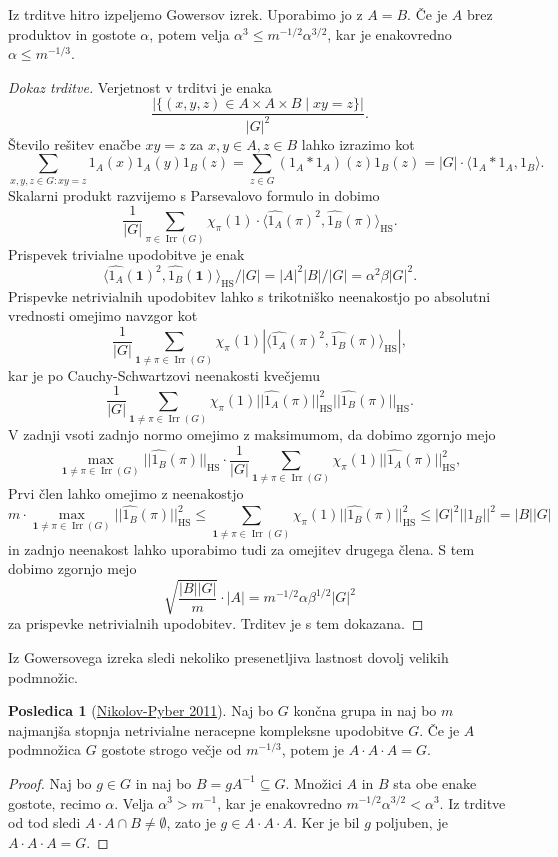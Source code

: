 \documentclass[11pt]{book}
\def\11{\mathbf{1}}
\DeclareMathOperator\Irr{Irr}
\DeclareMathOperator\HS{HS}
\theoremstyle{definition}
\theoremstyle{zgled}
\theoremstyle{odprtproblem}
\theoremstyle{domacanaloga}
\newenvironment{dokaz}
    {\color{siva}\begin{proof}}
    {\end{proof}}
\theoremstyle{izrek}
\newtheorem*{posledica}{Posledica}
\begin{document}
Iz trditve hitro izpeljemo Gowersov izrek. Uporabimo jo z $A=B$. Če je $A$ brez produktov in gostote $\alpha$, potem velja $\alpha^3 \leq m^{-1/2} \alpha^{3/2}$, kar je enakovredno $\alpha \leq m^{-1/3}$.


\begin{dokaz}[Dokaz trditve]
Verjetnost v trditvi je enaka 
\[
    \frac{|\{ (x,y,z) \in A \times A \times B \mid xy = z \}|}{|G|^2}.
\]
Število rešitev enačbe $xy = z$ za $x,y \in A, z \in B$ lahko izrazimo kot
\[
    \sum_{x,y,z \in G \colon xy = z} 1_A(x) 1_A(y) 1_B(z)
    = \sum_{z \in G} (1_A * 1_A)(z) 1_B(z)
    = |G| \cdot \langle 1_A * 1_A, 1_B \rangle.
\]
Skalarni produkt razvijemo s Parsevalovo formulo in dobimo
\[
    \frac{1}{|G|} \sum_{\pi \in \Irr(G)} \chi_{\pi}(1) \cdot \langle \widehat{1_A}(\pi)^2, \widehat{1_B}(\pi) \rangle_{\HS}.
\]
Prispevek trivialne upodobitve je enak
\[
    \langle \widehat{1_A}(\11)^2, \widehat{1_B}(\11) \rangle_{\HS}/|G| = |A|^2 |B| / |G| = \alpha^2 \beta |G|^2. 
\]
Prispevke netrivialnih upodobitev lahko s trikotniško neenakostjo po absolutni vrednosti omejimo navzgor kot
\[
    \frac{1}{|G|} \sum_{\11 \neq \pi \in \Irr(G)} \chi_{\pi}(1) \left| \langle \widehat{1_A}(\pi)^2, \widehat{1_B}(\pi) \rangle_{\HS} \right|,
\]
kar je po Cauchy-Schwartzovi neenakosti kvečjemu
\[
    \frac{1}{|G|} \sum_{\11 \neq \pi \in \Irr(G)} \chi_{\pi}(1) || \widehat{1_A}(\pi) ||_{\HS}^2 || \widehat{1_B}(\pi) ||_{\HS}.
\]
V zadnji vsoti zadnjo normo omejimo z maksimumom, da dobimo zgornjo mejo
\[
    \max_{\11 \neq \pi \in \Irr(G)} || \widehat{1_B}(\pi) ||_{\HS} \cdot 
    \frac{1}{|G|} \sum_{\11 \neq \pi \in \Irr(G)} \chi_{\pi}(1) || \widehat{1_A}(\pi) ||_{\HS}^2,
\]
Prvi člen lahko omejimo z neenakostjo
\[
    m \cdot \max_{\11 \neq \pi \in \Irr(G)} || \widehat{1_B}(\pi) ||^2_{\HS}
    \leq \sum_{\11 \neq \pi \in \Irr(G)} \chi_{\pi}(1) ||\widehat{1_B}(\pi)||_{\HS}^2 
    \leq |G|^2 ||1_B||^2 = |B||G|
\]
in zadnjo neenakost lahko uporabimo tudi za omejitev drugega člena. S tem dobimo zgornjo mejo
\[
  \sqrt{\frac{|B||G|}{m}} \cdot |A| = m^{-1/2} \alpha \beta^{1/2} |G|^2
\]
za prispevke netrivialnih upodobitev. Trditev je s tem dokazana.
\end{dokaz}

Iz Gowersovega izreka sledi nekoliko presenetljiva lastnost dovolj velikih podmnožic.

\begin{posledica}[\href{https://eudml.org/doc/277468}{Nikolov-Pyber 2011}]
Naj bo $G$ končna grupa in naj bo $m$ najmanjša stopnja netrivialne neracepne kompleksne upodobitve $G$. Če je $A$ podmnožica $G$ gostote strogo večje od $m^{-1/3}$, potem je $A \cdot A \cdot A = G$.
\end{posledica}
\begin{dokaz}
Naj bo $g \in G$ in naj bo $B = g A^{-1} \subseteq G$. Množici $A$ in $B$ sta obe enake gostote, recimo $\alpha$. Velja $\alpha^3 > m^{-1}$, kar je enakovredno $m^{-1/2} \alpha^{3/2} < \alpha^3$. Iz trditve od tod sledi $A \cdot A \cap B \neq \emptyset$, zato je $g \in A \cdot A \cdot A$. Ker je bil $g$ poljuben, je $A \cdot A \cdot A = G$.
\end{dokaz}
\end{document}
